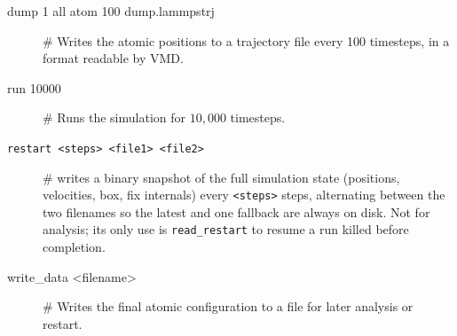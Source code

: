 \documentclass{article}
\begin{document}
\begin{description}
    \item[dump 1 all atom 100 dump.lammpstrj] \# Writes the atomic positions to a trajectory file every 100 timesteps, in a format readable by VMD.
    \item[run 10000] \# Runs the simulation for $10{,}000$ timesteps.
    \item[\texttt{restart <steps> <file1> <file2>}] \# writes a binary snapshot of the full simulation state (positions, velocities, box, fix internals) every \texttt{<steps>} steps, alternating between the two filenames so the latest and one fallback are always on disk. Not for analysis; its only use is \texttt{read\_restart} to resume a run killed before completion.
    \item[write\_data <filename>] \# Writes the final atomic configuration to a file for later analysis or restart.
\end{description}
\end{document}
